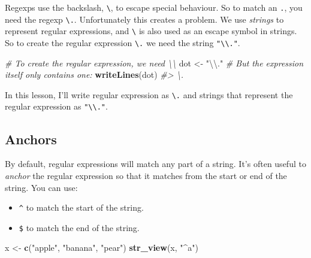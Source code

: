 \documentclass[]{book}
\newenvironment{Shaded}{\begin{snugshade}}{\end{snugshade}}
\newcommand{\CharTok}[1]{\textcolor[rgb]{0.31,0.60,0.02}{#1}}
\newcommand{\CommentTok}[1]{\textcolor[rgb]{0.56,0.35,0.01}{\textit{#1}}}
\newcommand{\KeywordTok}[1]{\textcolor[rgb]{0.13,0.29,0.53}{\textbf{#1}}}
\newcommand{\NormalTok}[1]{#1}
\newcommand{\StringTok}[1]{\textcolor[rgb]{0.31,0.60,0.02}{#1}}
\providecommand{\tightlist}{%
  \setlength{\itemsep}{0pt}\setlength{\parskip}{0pt}}
\begin{document}
Regexps use the backslash, \texttt{\textbackslash{}}, to escape special behaviour. So to match an \texttt{.}, you need the regexp \texttt{\textbackslash{}.}. Unfortunately this creates a problem. We use \emph{strings} to represent regular expressions, and \texttt{\textbackslash{}} is also used as an escape symbol in strings. So to create the regular expression \texttt{\textbackslash{}.} we need the string \texttt{"\textbackslash{}\textbackslash{}."}.

\begin{Shaded}
\begin{Highlighting}[]
\CommentTok{# To create the regular expression, we need \textbackslash{}\textbackslash{}}
\NormalTok{dot <-}\StringTok{ "}\CharTok{\textbackslash{}\textbackslash{}}\StringTok{."}
\CommentTok{# But the expression itself only contains one:}
\KeywordTok{writeLines}\NormalTok{(dot)}
\CommentTok{#> \textbackslash{}.}
\end{Highlighting}
\end{Shaded}

In this lesson, I'll write regular expression as \texttt{\textbackslash{}.} and strings that represent the regular expression as \texttt{"\textbackslash{}\textbackslash{}."}.

\hypertarget{anchors}{%
\subsection{Anchors}\label{anchors}}

By default, regular expressions will match any part of a string. It's often useful to \emph{anchor} the regular expression so that it matches from the start or end of the string. You can use:

\begin{itemize}
\tightlist
\item
  \texttt{\^{}} to match the start of the string.
\item
  \texttt{\$} to match the end of the string.
\end{itemize}

\begin{Shaded}
\begin{Highlighting}[]
\NormalTok{x <-}\StringTok{ }\KeywordTok{c}\NormalTok{(}\StringTok{"apple"}\NormalTok{, }\StringTok{"banana"}\NormalTok{, }\StringTok{"pear"}\NormalTok{)}
\KeywordTok{str_view}\NormalTok{(x, }\StringTok{"^a"}\NormalTok{)}
\end{Highlighting}
\end{Shaded}
\end{document}
